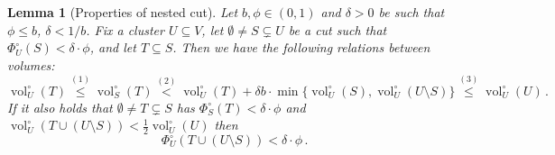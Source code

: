 \documentclass[epsfig,letter,11pt]{article}
\numberwithin{equation}{section}
\newcommand{\unvolc}[2]{\operatorname{vol}_{#2}^\circ (#1)}
\newcommand{\unspc}[2]{\Phi_{#2}^\circ (#1)}
\newtheorem{lemma}[theorem]{Lemma}
\begin{document}
\begin{lemma}[Properties of nested cut]
	\label{lem:relationsvol}
	Let $b, \phi \in (0,1)$ and $\delta > 0$ be such that $\phi \le b$, $\delta < 1/b$. Fix a cluster $U \subseteq V$, let $\emptyset \neq S \subsetneq U$ be a cut such that $\unspc{S}{U}<\delta \cdot \phi$, and let $T \subseteq S$. Then we have the following relations between volumes:
	\begin{equation*}
		\unvolc{T}{U} \overset{(1)}{\le} \unvolc{T}{S} \overset{(2)}{<} \unvolc{T}{U}+\delta b \cdot \min\{\unvolc{S}{U}, \unvolc{U \setminus S}{U}\}   \overset{(3)}{\le} \unvolc{U}{U}\, .
	\end{equation*}
	If it also holds that $\emptyset \neq T \subsetneq S$ has $\unspc{T}{S} < \delta \cdot \phi$ and $\unvolc{T \cup (U \setminus S)}{U} < \frac{1}{2} \unvolc{U}{U}$ then
	\begin{equation*}
		\unspc{T \cup (U \setminus S)}{U} < \delta \cdot \phi \, .
	\end{equation*}
\end{lemma}
\end{document}

